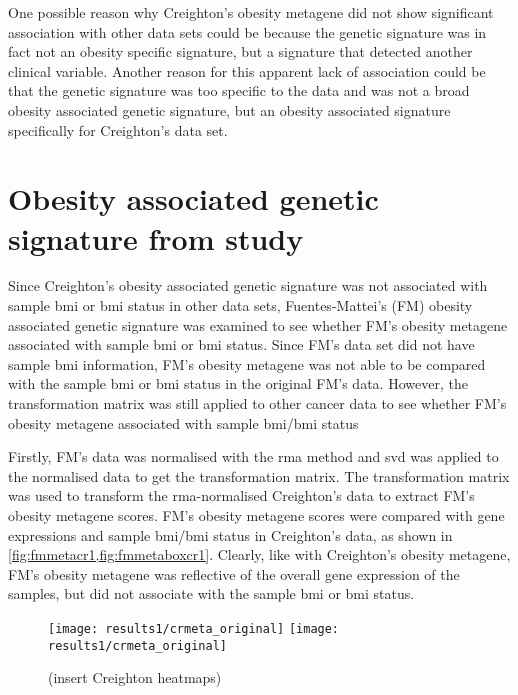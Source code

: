 One possible reason why Creighton's obesity metagene did not show significant association with other data sets could be because the genetic signature was in fact not an obesity specific signature, but a signature that detected another clinical variable.
Another reason for this apparent lack of association could be that the genetic signature was too specific to the data and was not a broad obesity associated genetic signature, but an obesity associated signature specifically for Creighton's data set.

\section{Obesity associated genetic signature from \citet{Fuentes-Mattei2014} study}
\label{sec:fm_obesity_metagene}

Since Creighton's obesity associated genetic signature was not associated with sample \gls{bmi} or \gls{bmi} status in other data sets, Fuentes-Mattei's (FM) obesity associated genetic signature was examined to see whether FM's obesity metagene associated with sample \gls{bmi} or \gls{bmi} status.
Since FM's data set did not have sample \gls{bmi} information, FM's obesity metagene was not able to be compared with the sample \gls{bmi} or \gls{bmi} status in the original FM's data.
However, the transformation matrix was still applied to other cancer data to see whether FM's obesity metagene associated with sample \gls{bmi}/\gls{bmi} status

Firstly, FM's data was normalised with the \gls{rma} method and \gls{svd} was applied to the normalised data to get the transformation matrix.
The transformation matrix was used to transform the \gls{rma}-normalised Creighton's data to extract FM's obesity metagene scores.
FM's obesity metagene scores were compared with gene expressions and sample \gls{bmi}/\gls{bmi} status in Creighton's data, as shown in \cref{fig:fmmetacr1,fig:fmmetaboxcr1}.
Clearly, like with Creighton's obesity metagene, FM's obesity metagene was reflective of the overall gene expression of the samples, but did not associate with the sample \gls{bmi} or \gls{bmi} status.

\begin{figure}[htp!]
	\centering
	\texttt{[image: results1/crmeta\_original]}
	\hfill
	\texttt{[image: results1/crmeta\_original]}
	\caption[FM metagene and Creighton's cancer data]{(insert Creighton heatmaps)}
	\label{fig:fmmetacr1}
\end{figure}

